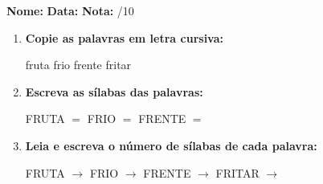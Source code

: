 \begin{exercicio}



\noindent\textbf{Nome:} \underline{\hspace{3.2cm}} \quad \textbf{Data:} \underline{\hspace{1.6cm}} \quad \textbf{Nota:} \underline{\hspace{0.9cm}}/10


\begin{enumerate}

  \item \textbf{Copie as palavras em letra cursiva:}
  \begin{center}
  fruta \quad frio \quad frente \quad fritar
  \end{center}
  \begin{center}
  \underline{\hspace{2.4cm}} \quad \underline{\hspace{2.4cm}} \quad \underline{\hspace{2.4cm}} \quad \underline{\hspace{2.4cm}}
  \end{center}

  \item \textbf{Escreva as sílabas das palavras:}
  \begin{center}
  FRUTA $=$ \underline{\hspace{1.5cm}} \underline{\hspace{1.5cm}} \quad FRIO $=$ \underline{\hspace{1.5cm}} \underline{\hspace{1.5cm}} \quad FRENTE $=$ \underline{\hspace{1.5cm}} \underline{\hspace{1.5cm}}
  \end{center}

  \item \textbf{Leia e escreva o número de sílabas de cada palavra:}
  \begin{center}
  FRUTA $\rightarrow$ \underline{\hspace{0.9cm}} \quad FRIO $\rightarrow$ \underline{\hspace{0.9cm}} \quad FRENTE $\rightarrow$ \underline{\hspace{0.9cm}} \quad FRITAR $\rightarrow$ \underline{\hspace{0.9cm}}
  \end{center}


\end{enumerate}
\end{exercicio}
